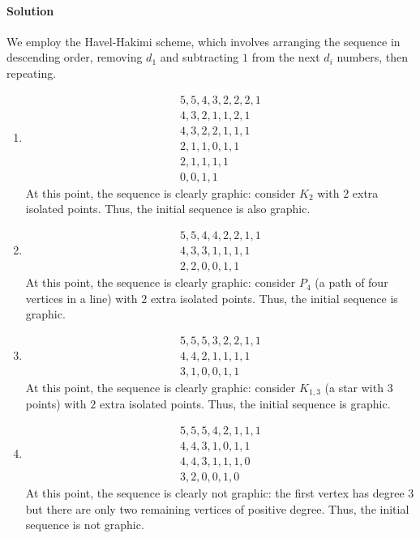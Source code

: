 \documentclass[10pt]{article}
\newcommand{\solution}{\paragraph{Solution}}
\begin{document}
    \solution We employ the Havel-Hakimi scheme, which involves arranging the
    sequence in descending order, removing $d_1$ and subtracting $1$ from the next
    $d_i$ numbers, then repeating.
    \begin{enumerate}
        \item \begin{align*}
            5, 5, 4, 3, 2, 2, 2, 1 \\
            4, 3, 2, 1, 1, 2, 1 \\
            4, 3, 2, 2, 1, 1, 1 \tag{Reorder} \\
            2, 1, 1, 0, 1, 1 \\
            2, 1, 1, 1, 1 \tag{Reorder} \\
            0, 0, 1, 1
        \end{align*}
        At this point, the sequence is clearly graphic: consider $K_2$ with $2$ extra
        isolated points. Thus, the initial sequence is also graphic.

        \item \begin{align*}
            5, 5, 4, 4, 2, 2, 1, 1 \\
            4, 3, 3, 1, 1, 1, 1 \\
            2, 2, 0, 0, 1, 1
        \end{align*}
        At this point, the sequence is clearly graphic: consider $P_4$ (a path of
        four vertices in a line) with $2$ extra isolated points. Thus, the initial
        sequence is graphic.
        
        \item \begin{align*}
            5, 5, 5, 3, 2, 2, 1, 1 \\
            4, 4, 2, 1, 1, 1, 1 \\
            3, 1, 0, 0, 1, 1
        \end{align*}
        At this point, the sequence is clearly graphic: consider $K_{1, 3}$ (a star
        with 3 points) with $2$ extra isolated points. Thus, the initial sequence is
        graphic.

        \item \begin{align*}
            5, 5, 5, 4, 2, 1, 1, 1 \\
            4, 4, 3, 1, 0, 1, 1 \\
            4, 4, 3, 1, 1, 1, 0 \tag{Reorder} \\
            3, 2, 0, 0, 1, 0
        \end{align*}
        At this point, the sequence is clearly not graphic: the first vertex has
        degree $3$ but there are only two remaining vertices of positive degree.
        Thus, the initial sequence is not graphic.

    \end{enumerate}
\end{document}
